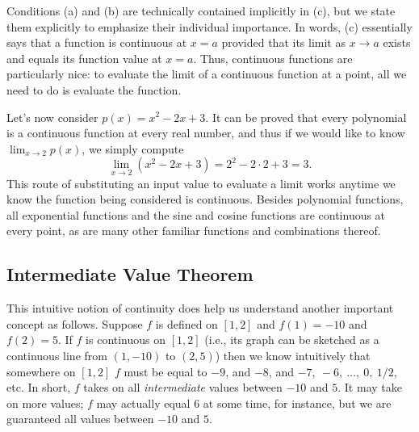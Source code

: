 Conditions (a) and (b) are technically contained implicitly in (c), but we state them explicitly to emphasize their individual importance.  In words, (c) essentially says that a function is continuous at $x = a$ provided that its limit as $x \to a$ exists and equals its function value at $x = a$.  Thus, continuous functions are particularly nice:  to evaluate the limit of a continuous function at a point, all we need to do is evaluate the function.


Let's now consider $p(x) = x^2 - 2x + 3$.  It can be proved that every polynomial is a continuous function at every real number, and thus if we would like to know                                                                                 $\lim_{x \to 2} p(x)$, we simply compute
$$\lim_{x \to 2} (x^2 - 2x + 3) = 2^2 - 2 \cdot 2 + 3 = 3.$$
This route of substituting an input value to evaluate a limit works anytime we know the function being considered is continuous.  Besides polynomial functions, all exponential functions and the sine and cosine functions are continuous at every point, as are many other familiar functions and combinations thereof.  




\subsection*{Intermediate Value Theorem}

This intuitive notion of continuity does help us understand another important concept as follows. Suppose $f$ is defined on $[1,2]$ and $f(1) = -10$ and $f(2) = 5$. If $f$ is continuous on $[1,2]$ (i.e., its graph can be sketched as a continuous line from $(1,-10)$ to $(2,5)$) then we know intuitively that somewhere on $[1,2]$ $f$ must be equal to $-9$, and $-8$, and $-7,\ -6,\ \ldots,\ 0,\ 1/2,$ etc. In short, $f$ takes on all \textit{intermediate} values between $-10$ and $5$. It may take on more values; $f$ may actually equal 6 at some time, for instance, but we are guaranteed all values between $-10$ and $5$. 


